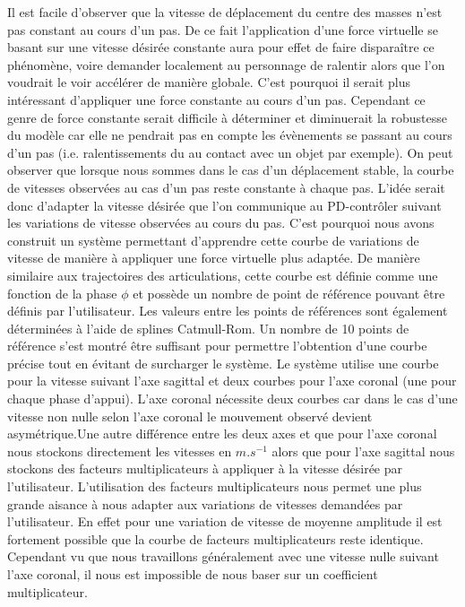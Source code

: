 \documentclass[runningheads,a4paper]{llncs}
\begin{document}
Il est facile d'observer que la vitesse de déplacement du centre des masses n'est pas constant au cours d'un pas. De ce fait l'application d'une force virtuelle se basant sur une vitesse désirée constante aura pour effet de faire disparaître ce phénomène, voire demander localement au personnage de ralentir alors que l'on voudrait le voir accélérer de manière globale. C'est pourquoi il serait plus intéressant d'appliquer une force constante au cours d'un pas. Cependant ce genre de force constante serait difficile à déterminer et diminuerait la robustesse du modèle car elle ne pendrait pas en compte les évènements se passant au cours d'un pas (i.e. ralentissements du au contact avec un objet par exemple). On peut observer que lorsque nous sommes dans le cas d'un déplacement stable, la courbe de vitesses observées au cas d'un pas reste constante à chaque pas. L'idée serait donc d'adapter la vitesse désirée que l'on communique au PD-contrôler suivant les variations de vitesse observées au cours du pas. C'est pourquoi nous avons construit un système permettant d'apprendre cette courbe de variations de vitesse de manière à appliquer une force virtuelle plus adaptée. De manière similaire aux trajectoires des articulations, cette courbe est définie comme une fonction de la phase \(\phi\) et possède un nombre de point de référence pouvant être définis par l'utilisateur. Les valeurs entre les points de références sont également déterminées à l'aide de splines Catmull-Rom. Un nombre de 10 points de référence s'est montré être suffisant pour permettre l'obtention d'une courbe précise tout en évitant de surcharger le système. Le système utilise une courbe pour la vitesse suivant l'axe sagittal et deux courbes pour l'axe coronal (une pour chaque phase d'appui). L'axe coronal nécessite deux courbes car dans le cas d'une vitesse non nulle selon l'axe coronal le mouvement observé devient asymétrique.Une autre différence entre les deux axes et que pour l'axe coronal nous stockons directement les vitesses en $m.s^{-1}$ alors que pour l'axe sagittal nous stockons des facteurs multiplicateurs à appliquer à la vitesse désirée par l'utilisateur. L'utilisation des facteurs multiplicateurs nous permet une plus grande aisance à nous adapter aux variations de vitesses demandées par l'utilisateur. En effet pour une variation de vitesse de moyenne amplitude il est fortement possible que la courbe de facteurs multiplicateurs reste identique. Cependant vu que nous travaillons généralement avec une vitesse nulle suivant l'axe coronal, il nous est impossible de nous baser sur un coefficient multiplicateur.
\end{document}
